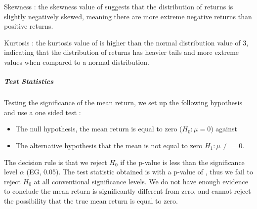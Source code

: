 \documentclass{article}
\begin{document}
Skewness : the skewness value of \askew suggests that the distribution of returns is slightly negatively skewed, meaning there are more extreme negative returns than positive returns. 

Kurtosis : the kurtosis value of \akurt is higher than the normal distribution value of 3, indicating that the distribution of returns has heavier tails and more extreme values when compared to a normal distribution. 

\subparagraph{Test Statistics}

Testing the significance of the mean return, we set up the following hypothesis and use a one sided test :
\begin{itemize}
	\item The null hypothesis, the mean return is equal to zero ($H_0 : \mu =0$) against
	\item The alternative hypothesis that the mean is not equal to zero $H_1 : \mu \neq = 0$.
\end{itemize}
The decision rule is that we reject $H_0$ if the p-value is less than the significance level $\alpha$ (EG, 0.05). 
The test statistic obtained is \amut with a p-value of \amup, thus we fail to reject $H_0$ at all conventional significance levels. 
We do not have enough evidence to conclude the mean return is significantly different from zero, and cannot reject the possibility that the true mean return is equal to zero. 
\end{document}
